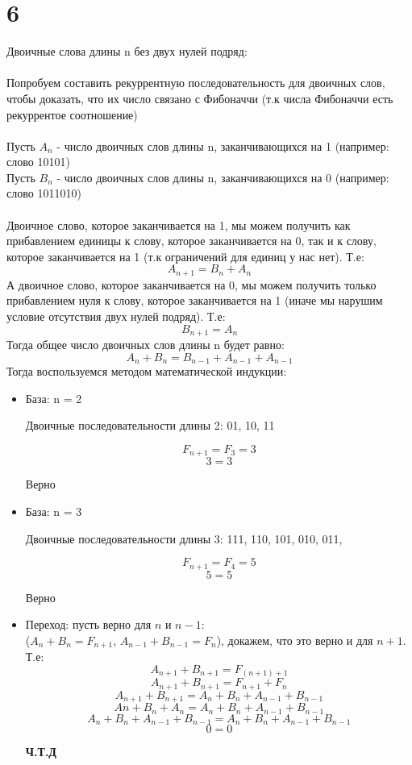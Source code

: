 \documentclass[a4paper,12pt]{article}
\begin{document}
\section*{6}
Двоичные слова длины n без двух нулей подряд:
\\\\
Попробуем составить рекуррентную последовательность  для двоичных слов, чтобы доказать, что их число связано с Фибоначчи (т.к числа Фибоначчи есть рекуррентое соотношение)
\\\\
Пусть $A_n$ -  число двоичных слов длины n, заканчивающихся на 1 (например: слово  10101)
\\
Пусть $B_n$ - число двоичных слов длины n, заканчивающихся  на 0 (например: слово 1011010)
\\\\
Двоичное слово, которое заканчивается на 1, мы можем получить как прибавлением единицы к слову, которое заканчивается на 0, так и к слову, которое заканчивается на 1 (т.к ограничений для единиц у нас нет). Т.е:
\[
A_{n+1} = B_{n} + A_{n}
\]
А двоичное слово, которое заканчивается на 0, мы можем получить только прибавлением нуля к слову, которое заканчивается на 1 (иначе мы нарушим условие отсутствия двух нулей подряд).  Т.е:
\[
B_{n+1}= A_{n}
\]
Тогда общее число двоичных слов длины n будет равно:
\[
A_n  + B_n  = B_{n-1} + A_{n-1} + A_{n-1}
\]
Тогда воспользуемся методом математической индукции:
\begin{itemize}
\item База: n = 2 

Двоичные последовательности длины 2: 01, 10, 11

\[
F_{n+1} = F_3 = 3
\]
\[
3 = 3
\]
\begin{center}
Верно
\end{center}
\item База: n = 3

Двоичные последовательности длины 3: 111, 110, 101, 010, 011, 

\[
F_{n+1} = F_4 = 5
\]
\[
5 = 5
\]
\begin{center}
Верно
\end{center}
\item  Переход: пусть верно для $n$ и $n-1$:\\ ($ A_{n} + B_{n} =  F_{n+1} $, \;$A_{n-1} + B_{n-1} = F_n$), докажем, что это верно и для $n+1$. Т.е:
\[
A_{n+1} + B_{n+1} = F_{(n+1) +1}
\]
\[
A_{n+1} + B_{n+1} = F_{n+1} + F_{n}
\]
\[
A_{n+1} + B_{n+1} = A_{n} + B_{n} + A_{n-1} + B_{n-1}
\]
\[
A{n} + B_{n} + A_{n} = A_{n} + B_{n} + A_{n-1} + B_{n-1}
\]
\[
A_{n} + B_{n} + A_{n-1} + B_{n-1} = A_{n} + B_{n} + A_{n-1} + B_{n-1}
\]
\[
0 = 0
\]
\begin{center}
\textbf{Ч.Т.Д}
\end{center}
\end{itemize}
\end{document}
